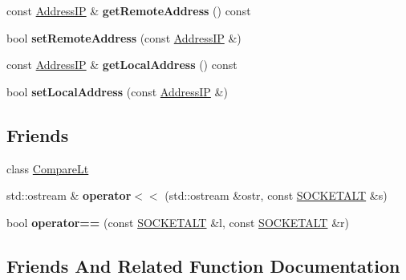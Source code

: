 \begin{DoxyCompactItemize}
\item 
const \hyperlink{structAddressIP}{Address\+IP} \& {\bfseries get\+Remote\+Address} () const \hypertarget{classSOCKETALT_a9d62c4e4439ac3d80be8600c46fe4370}{}\label{classSOCKETALT_a9d62c4e4439ac3d80be8600c46fe4370}

\item 
bool {\bfseries set\+Remote\+Address} (const \hyperlink{structAddressIP}{Address\+IP} \&)\hypertarget{classSOCKETALT_a4db7c599bc74aa4291a2453bdf27cac2}{}\label{classSOCKETALT_a4db7c599bc74aa4291a2453bdf27cac2}

\item 
const \hyperlink{structAddressIP}{Address\+IP} \& {\bfseries get\+Local\+Address} () const \hypertarget{classSOCKETALT_a2ec44a9ae1415da80adb2871789db120}{}\label{classSOCKETALT_a2ec44a9ae1415da80adb2871789db120}

\item 
bool {\bfseries set\+Local\+Address} (const \hyperlink{structAddressIP}{Address\+IP} \&)\hypertarget{classSOCKETALT_ae34147888af075f98b20efc548f1efa8}{}\label{classSOCKETALT_ae34147888af075f98b20efc548f1efa8}

\end{DoxyCompactItemize}
\subsection*{Friends}
\begin{DoxyCompactItemize}
\item 
class \hyperlink{classSOCKETALT_a1501d9e28f48d093461da1163dab2e4e}{Compare\+Lt}
\item 
std\+::ostream \& {\bfseries operator$<$$<$} (std\+::ostream \&ostr, const \hyperlink{classSOCKETALT}{S\+O\+C\+K\+E\+T\+A\+LT} \&s)\hypertarget{classSOCKETALT_a13242afe5455ac9062215324c49002dc}{}\label{classSOCKETALT_a13242afe5455ac9062215324c49002dc}

\item 
bool {\bfseries operator==} (const \hyperlink{classSOCKETALT}{S\+O\+C\+K\+E\+T\+A\+LT} \&l, const \hyperlink{classSOCKETALT}{S\+O\+C\+K\+E\+T\+A\+LT} \&r)\hypertarget{classSOCKETALT_ac9203057d1c079db34e68517ece6eb5f}{}\label{classSOCKETALT_ac9203057d1c079db34e68517ece6eb5f}

\end{DoxyCompactItemize}


\subsection{Friends And Related Function Documentation}
